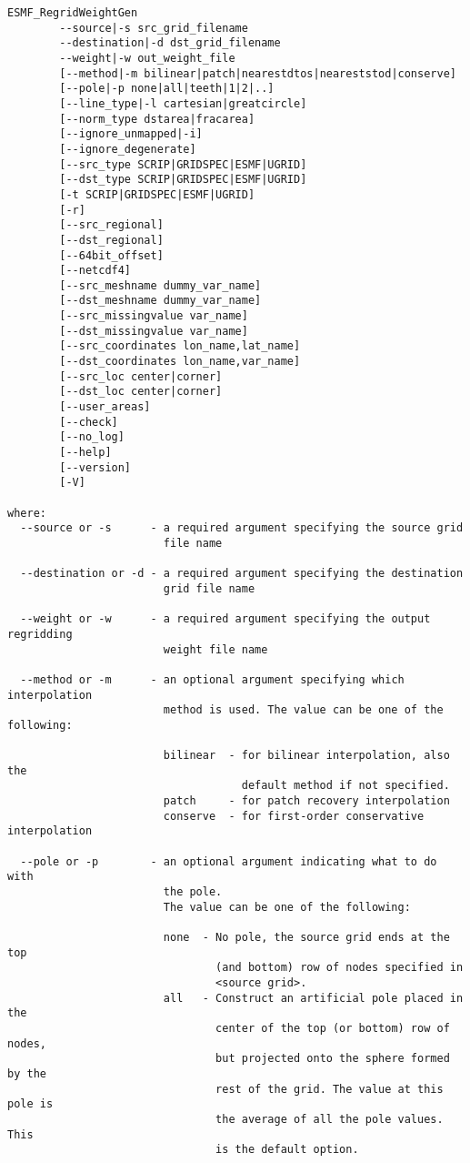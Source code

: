 \begin{verbatim}
ESMF_RegridWeightGen  
        --source|-s src_grid_filename
        --destination|-d dst_grid_filename
        --weight|-w out_weight_file
        [--method|-m bilinear|patch|nearestdtos|neareststod|conserve]
        [--pole|-p none|all|teeth|1|2|..]
        [--line_type|-l cartesian|greatcircle]
        [--norm_type dstarea|fracarea]
        [--ignore_unmapped|-i]
        [--ignore_degenerate]
        [--src_type SCRIP|GRIDSPEC|ESMF|UGRID]
        [--dst_type SCRIP|GRIDSPEC|ESMF|UGRID]
        [-t SCRIP|GRIDSPEC|ESMF|UGRID]
        [-r]
        [--src_regional]
        [--dst_regional]
        [--64bit_offset]
        [--netcdf4]
        [--src_meshname dummy_var_name]
        [--dst_meshname dummy_var_name]
        [--src_missingvalue var_name]
        [--dst_missingvalue var_name]
        [--src_coordinates lon_name,lat_name]
        [--dst_coordinates lon_name,var_name]
        [--src_loc center|corner]
        [--dst_loc center|corner]
        [--user_areas]
        [--check]
        [--no_log]
        [--help]
        [--version]
        [-V]

where:
  --source or -s      - a required argument specifying the source grid
                        file name

  --destination or -d - a required argument specifying the destination
                        grid file name

  --weight or -w      - a required argument specifying the output regridding
                        weight file name

  --method or -m      - an optional argument specifying which interpolation
                        method is used. The value can be one of the following:

                        bilinear  - for bilinear interpolation, also the
                                    default method if not specified.
                        patch     - for patch recovery interpolation
                        conserve  - for first-order conservative interpolation

  --pole or -p        - an optional argument indicating what to do with
                        the pole.
                        The value can be one of the following:

                        none  - No pole, the source grid ends at the top
                                (and bottom) row of nodes specified in
                                <source grid>.
                        all   - Construct an artificial pole placed in the
                                center of the top (or bottom) row of nodes,
                                but projected onto the sphere formed by the
                                rest of the grid. The value at this pole is
                                the average of all the pole values. This
                                is the default option.


\end{verbatim}
